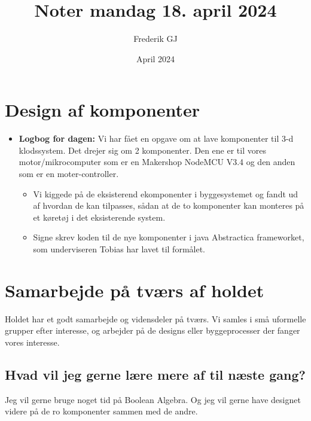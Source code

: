 \documentclass{article}
\title{Noter mandag 18. april 2024}
\author{Frederik GJ}
\date{April 2024}
\begin{document}
\maketitle

\section{Design af komponenter}

\begin{itemize}
    \item \textbf{Logbog for dagen:} Vi har fået en opgave om at lave komponenter til 3-d klodssystem. Det drejer sig om 2 komponenter. Den ene er til vores motor/mikrocomputer som er en Makershop NodeMCU V3.4 og den anden som er en moter-controller. 
    \begin{itemize}
        \item Vi kiggede på de eksisterend ekomponenter i byggesystemet og fandt ud af hvordan de kan tilpasses, sådan at de to komponenter kan monteres på et køretøj i det eksisterende system.
        \item Signe skrev koden til de nye komponenter i java Abstractica frameworket, som underviseren Tobias har lavet til formålet.
    \end{itemize}
\end{itemize}

\section{Samarbejde på tværs af holdet}
Holdet har et godt samarbejde og vidensdeler på tværs. 
Vi samles i små uformelle grupper efter interesse, og arbejder på de designs eller byggeprocesser der fanger vores interesse. 
\subsection{Hvad vil jeg gerne lære mere af til næste gang?}
Jeg vil gerne bruge noget tid på Boolean Algebra. Og jeg vil gerne have designet videre på de ro komponenter sammen med de andre. 
\end{document}
